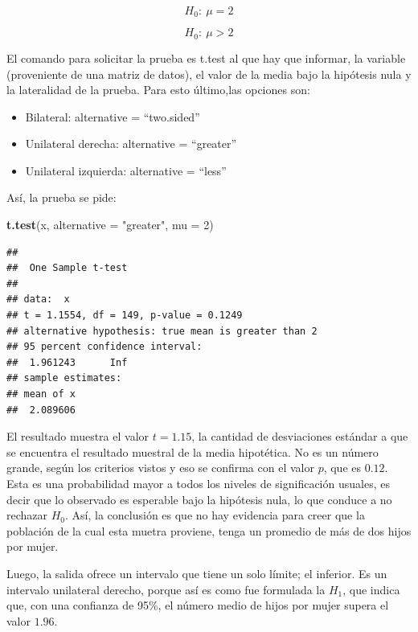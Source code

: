 \documentclass[]{book}
\newenvironment{Shaded}{\begin{snugshade}}{\end{snugshade}}
\newcommand{\DataTypeTok}[1]{\textcolor[rgb]{0.13,0.29,0.53}{#1}}
\newcommand{\DecValTok}[1]{\textcolor[rgb]{0.00,0.00,0.81}{#1}}
\newcommand{\KeywordTok}[1]{\textcolor[rgb]{0.13,0.29,0.53}{\textbf{#1}}}
\newcommand{\NormalTok}[1]{#1}
\newcommand{\StringTok}[1]{\textcolor[rgb]{0.31,0.60,0.02}{#1}}
\providecommand{\tightlist}{%
  \setlength{\itemsep}{0pt}\setlength{\parskip}{0pt}}
\begin{document}
\[H_{0}:\ \mu = 2\]

\[H_{0}:\ \mu > 2\]

El comando para solicitar la prueba es t.test al que hay que informar, la variable (proveniente de una matriz de datos), el valor de la media bajo la hipótesis nula y la lateralidad de la prueba. Para esto último,las opciones son:

\begin{itemize}
\tightlist
\item
  Bilateral: alternative = ``two.sided''
\item
  Unilateral derecha: alternative = ``greater''
\item
  Unilateral izquierda: alternative = ``less''
\end{itemize}

Así, la prueba se pide:

\begin{Shaded}
\begin{Highlighting}[]
\KeywordTok{t.test}\NormalTok{(x, }\DataTypeTok{alternative =} \StringTok{"greater"}\NormalTok{, }\DataTypeTok{mu =} \DecValTok{2}\NormalTok{)}
\end{Highlighting}
\end{Shaded}

\begin{verbatim}
## 
##  One Sample t-test
## 
## data:  x
## t = 1.1554, df = 149, p-value = 0.1249
## alternative hypothesis: true mean is greater than 2
## 95 percent confidence interval:
##  1.961243      Inf
## sample estimates:
## mean of x 
##  2.089606
\end{verbatim}

El resultado muestra el valor \(t=1.15\), la cantidad de desviaciones estándar a que se encuentra el resultado muestral de la media hipotética. No es un número grande, según los criterios vistos y eso se confirma con el valor \(p\), que es \(0.12\). Esta es una probabilidad mayor a todos los niveles de significación usuales, es decir que lo observado es esperable bajo la hipótesis nula, lo que conduce a no rechazar \(H_{0}\). Así, la conclusión es que no hay evidencia para creer que la población de la cual esta muetra proviene, tenga un promedio de más de dos hijos por mujer.

Luego, la salida ofrece un intervalo que tiene un solo límite; el inferior. Es un intervalo unilateral derecho, porque así es como fue formulada la \(H_{1}\), que indica que, con una confianza de 95\%, el número medio de hijos por mujer supera el valor \(1.96\).
\end{document}
